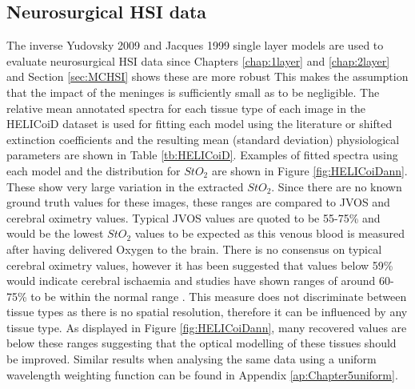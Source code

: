 \subsection{Neurosurgical HSI data}
The inverse Yudovsky 2009 and Jacques 1999 single layer models are used to evaluate neurosurgical HSI data since Chapters \ref{chap:1layer} and \ref{chap:2layer} and Section \ref{sec:MCHSI} shows these are more robust
This makes the assumption that the impact of the meninges is sufficiently small as to be negligible. 
The relative mean annotated spectra for each tissue type of each image in the HELICoiD dataset is used for fitting each model using the literature or shifted extinction coefficients and the resulting mean (standard deviation) physiological parameters are shown in Table \ref{tb:HELICoiD}. Examples of fitted spectra using each model and the distribution for $StO_2$ are shown in Figure \ref{fig:HELICoiDann}. These show very large variation in the extracted $StO_2$. Since there are no known ground truth values for these images, these ranges are compared to JVOS and cerebral oximetry values. Typical JVOS values are quoted to be 55-75\% \cite{Raith2020, Zhong2021} and would be the lowest $StO_2$ values to be expected as this venous blood is measured after having delivered Oxygen to the brain. There is no consensus on typical cerebral oximetry values, however it has been suggested that values below 59\% would indicate cerebral ischaemia \cite{Zhong2021} and studies have shown ranges of around 60-75\% to be within the normal range \cite{Lian2020}. This measure does not discriminate between tissue types as there is no spatial resolution, therefore it can be influenced by any tissue type. As displayed in Figure \ref{fig:HELICoiDann}, many recovered values are below these ranges suggesting that the optical modelling of these tissues should be improved. Similar results when analysing the same data using a uniform wavelength weighting function can be found in Appendix \ref{ap:Chapter5uniform}.

